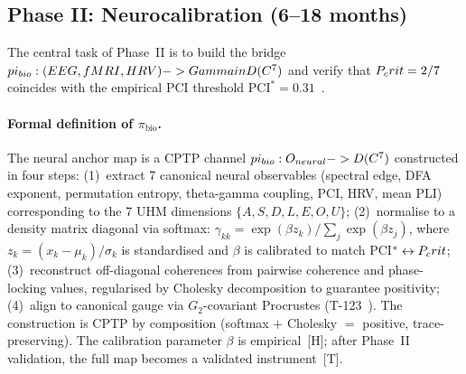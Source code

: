 \subsection{Phase II: Neurocalibration (6--18 months)}
\label{subsec:phase2}

The central task of Phase~II is to build the bridge
$pi_{bio}: (EEG, fMRI, HRV) -> Gamma in
D(C^7)$ and verify that $P_crit = 2/7$ coincides with the empirical PCI
threshold $\mathrm{PCI}^* = 0.31$~\cite{casali2013}.

\paragraph{Formal definition of $\pi_{\mathrm{bio}}$.}
The neural anchor map is a CPTP channel
$pi_{bio}: O_{neural} -> D(C^7)$
constructed in four steps:
(1)~extract 7 canonical neural observables (spectral edge, DFA exponent, permutation
entropy, theta-gamma coupling, PCI, HRV, mean PLI) corresponding to the 7 UHM
dimensions $\{A,S,D,L,E,O,U\}$;
(2)~normalise to a density matrix diagonal via softmax:
$\gamma_{kk} = \exp(\beta z_k)/\sum_j \exp(\beta z_j)$, where $z_k = (x_k - \mu_k)/\sigma_k$
is standardised and $\beta$ is calibrated to match PCI$^* \leftrightarrow P_crit$;
(3)~reconstruct off-diagonal coherences from pairwise coherence and phase-locking values,
regularised by Cholesky decomposition to guarantee positivity;
(4)~align to canonical gauge via $G_2$-covariant Procrustes (T-123~).
The construction is CPTP by composition (softmax $+$ Cholesky $=$ positive, trace-preserving).
The calibration parameter $\beta$ is empirical~[H]; after Phase~II validation, the full
map becomes a validated instrument~[T].

